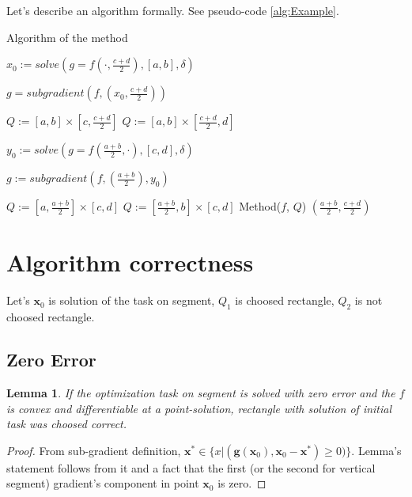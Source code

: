 \documentclass[12pt]{article}
\newtheorem{lemma}{Lemma}[section]
\begin{document}
Let's describe an algorithm formally. See pseudo-code \ref{alg:Example}.

\begin{algorithm}[H]
\caption{Algorithm of the method}\label{alg:Example}
\begin{algorithmic}[1]

$x_0:= solve(g = f(\cdot, \frac{c+d}{2}), [a,b], \delta)$
 
$g = subgradient(f, (x_0, \frac{c+d}{2}))$
 
\State$Q := [a,b] \times [c, \frac{c+d}{2}]$ 
\Else
\State$Q := [a,b] \times [\frac{c+d}{2}, d]$ 
\EndIf

 $y_0:= solve(g = f(\frac{a+b}{2}, \cdot), [c,d], \delta)$
 
 $g := subgradient(f, (\frac{a+b}{2}), y_0)$
 
 \State$Q := [a, \frac{a+b}{2}] \times [c, d]$ 
\Else
\State$Q := [\frac{a+b}{2},b] \times [c, d]$ 
\EndIf
{}
\State Method($f$, $Q$) 
\EndIf
\Return $(\frac{a+b}{2}, \frac{c+d}{2})$
\EndFunction 
 \end{algorithmic}
\end{algorithm}

\section{Algorithm correctness}
Let's $\textbf{x}_0$ is solution of the task on segment, $Q_1$ is choosed rectangle, $Q_2$ is not choosed rectangle.

\subsection{Zero Error}

\begin{lemma}\label{l1}
If the optimization task on segment is solved with zero error and the $f$ is convex and differentiable at a point-solution, rectangle with solution of initial task was choosed correct.
\end{lemma}
\begin{proof}
From sub-gradient definition, $\textbf{x}^* \in \{x|(\textbf{g}(\textbf{x}_0), \textbf{x}_0 - \textbf{x}^*) \geq 0)\}$. Lemma's statement follows from it and a fact that the first (or the second for vertical segment) gradient's component in point $\textbf{x}_0$ is zero.
\end{proof}
\end{document}
